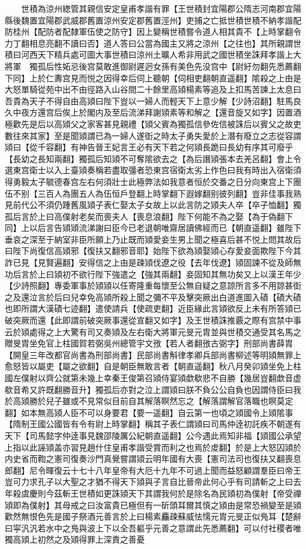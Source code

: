 　　世積為涼州緫管其親信安定皇甫孝諧有罪【王世積封宜陽郡公隋志河南郡宜陽縣後魏置宜陽郡武威郡舊置涼州安定郡舊置涇州】吏捕之亡抵世積世積不納孝諧配防桂州【配防者配隸軍伍使之防守】因上變稱世積嘗令道人相其貴不【上時掌翻令力丁翻相息亮翻不讀曰否】道人答曰公當為國主又將之涼州【之往也】其所親謂世積曰河西天下精兵處可圖大事世積曰涼州土曠人希非用武之國世積坐誅拜孝諧上大將軍　獨孤后性妬忌後宫莫敢進御尉遲迥女孫有美色先没宫中【尉紆勿翻先悉薦翻下同】上於仁夀宫見而悦之因得幸后伺上聽朝【伺相吏翻朝直遥翻】隂殺之上由是大怒單騎從苑中出不由徑路入山谷間二十餘里高熲楊素等追及上扣馬苦諫上太息曰吾貴為天子不得自由高熲曰陛下豈以一婦人而輕天下上意少解【少詩沼翻】駐馬良久中夜方還宫后俟上於閣内及至后流涕拜謝熲素等和解之【還音旋又如字】因置酒極歡先是后以高熲父之家客甚見親禮【熲父賓為獨孤信參佐信被誅后以賓父之故吏數往來其家】至是聞熲謂已為一婦人遂衘之時太子勇失愛於上潛有廢立之志從容謂熲曰【從千容翻】有神告晉王妃言王必有天下若之何熲長跪曰長幼有序其可廢乎【長幼之長知兩翻】獨孤后知熲不可奪隂欲去之【為后譖熲張本去羌呂翻】會上令選東宫衛士以入上臺熲奏稱若盡取彊者恐東宫宿衛太劣上作色曰我有時出入宿衛須得勇毅太子毓德春宫左右何須壯士此極弊法如我意者恒於交番之日分向東宫上下團伍不别【三百人為團五人為伍恒戶登翻上時掌翻下遐嫁翻别彼列翻】豈非佳事我熟見前代公不須仍踵舊風熲子表仁娶太子女故上以此言防之熲夫人卒【卒子恤翻】獨孤后言於上曰高僕射老矣而喪夫人【喪息浪翻】陛下何能不為之娶【為于偽翻下同】上以后言告熲熲流涕謝曰臣今已老退朝唯齋居讀佛經而已【朝直遥翻】雖陛下垂哀之深至于納室非臣所願上乃止既而熲愛妾生男上聞之極喜后甚不悦上問其故后曰陛下尚復信高熲邪【復扶又翻邪音耶】始陛下欲為熲娶熲心存愛妾面欺陛下今其詐已見【見賢遍翻】安得信之上由是疎熲伐遼之役【去年伐遼】熲固諫不從及師無功后言於上曰熲初不欲行陛下強遣之【強其兩翻】妾固知其無功矣又上以漢王年少【少詩照翻】專委軍事於熲熲以任寄隆重每懷至公無自疑之意諒所言多不用諒甚衘之及還泣言於后曰兒幸免高熲所殺上聞之彌不平及擊突厥出白道進圖入磧【磧大磧也即所謂大漢磧七迹翻】遣使請兵【使疏吏翻】近臣緣此言熲欲反上未有所答熲已破突厥而還【此即謂前破突厥事還從宣翻又如字】及王世積誅推覈之際有宫禁中事云於熲處得之上大驚有司又奏熲及左右衛大將軍元旻元胄並與世積交通受其名馬之贈旻胄坐免官上柱國賀若弼吳州總管宇文㢸【若人者翻㢸古弼字】刑部尚書薛胄【開皇三年改都官尚書為刑部尚書】民部尚書斛律孝卿兵部尚書柳述等明熲無罪上愈怒皆以屬吏【屬之欲翻】自是朝臣無敢言者【朝直遥翻】秋八月癸卯熲坐免上柱國左僕射以齊公就第未幾上幸秦王俊第召熲侍宴熲歔欷悲不自勝【幾居豈翻歔音虚欷音希又許既翻勝音升】獨孤后亦對之泣上謂熲曰朕不負公公自負也因謂侍臣曰我於高熲勝於兒子雖或不見常似目前自其解落瞑然忘之【解落謂解官落職也瞑莫定翻】如本無高熲人臣不可以身要君【要一遥翻】自云第一也頃之熲國令上熲隂事【隋制王國公國皆有令有尉上時掌翻】稱其子表仁謂熲曰司馬仲逹初託疾不朝遂有天下【司馬懿字仲逹事見魏邵陵厲公紀朝直遥翻】公今遇此焉知非福【熲國公承望上指以此誣熲盖亦習見趙什住皇甫孝諧受賞而利之也焉於䖍翻】於是上大怒囚熲於内史省而鞫之憲司復奏沙門真覺嘗謂熲云明年國有大喪【憲司法司也復扶又翻喪息郎翻】尼令暉復云十七十八年皇帝有大厄十九年不可過上聞而益怒顧謂羣臣曰帝王豈可力求孔子以大聖之才猶不得天下熲與子言自比晉帝此何心乎有司請斬之上曰去年殺虞慶則今茲斬王世積如更誅熲天下其謂我何於是除名為民熲初為僕射【帝受禪熲即為僕射】其母戒之曰汝富貴已極但有一斫頭耳爾其慎之熲由是常恐禍變至是熲歡然無恨色先是國子祭酒元善言於上曰楊素麤疎蘇威怯懦元胄元旻正似鳬耳【楚辭曰寜汎汎若水中之鳬與波上下以全吾軀乎元善之意謂此先悉薦翻】可以付社稷者唯獨高熲上初然之及熲得罪上深責之善憂